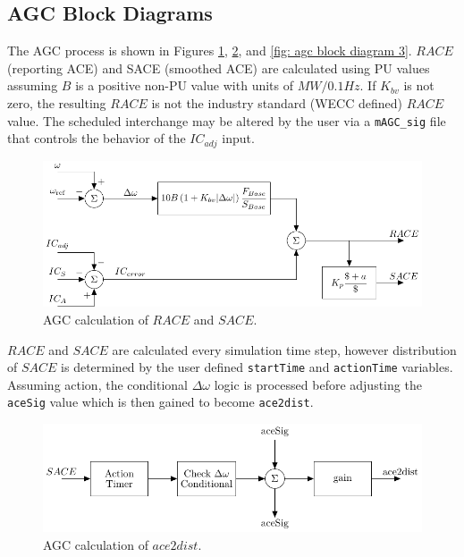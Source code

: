 \subsection{AGC Block Diagrams}
The AGC process is shown in Figures \ref{fig: agc block diagram 1}, \ref{fig: agc block diagram 2}, and \ref{fig: agc block diagram 3}.
$RACE$ (reporting ACE) and SACE (smoothed ACE) are calculated using PU values assuming $B$ is a positive non-PU value with units of $MW/0.1Hz$.
If $K_{bv}$ is not zero, the resulting $RACE$ is not the industry standard (WECC defined) $RACE$ value.
The scheduled interchange may be altered by the user via a \verb|mAGC_sig| file that controls the behavior of the $IC_{adj}$ input.


\begin{figure}[!h]
	\centering
	\footnotesize
	\includegraphics[width=\linewidth]{sections/agc/200722-AGCblockdiagram-p1}
	\caption{AGC calculation of $RACE$ and $SACE$.}
	\label{fig: agc block diagram 1}
\end{figure}%

\pagebreak
$RACE$ and $SACE$ are calculated every simulation time step, however
distribution of $SACE$ is determined by the user defined \verb|startTime| and \verb|actionTime| variables.
Assuming action, the conditional $\Delta\omega$ logic is processed before adjusting the \verb|aceSig| value which is then gained to become \verb|ace2dist|.

\begin{figure}[!h]
	\centering
	\footnotesize
	\includegraphics[width=\linewidth]{sections/agc/200722-AGCblockdiagram-p2}
	\caption{AGC calculation of $ace2dist$.}
	\label{fig: agc block diagram 2}
\end{figure}%

